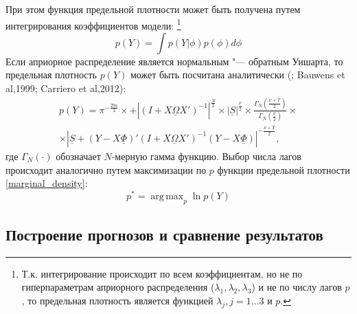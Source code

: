 \documentclass[11pt]{article} %
\DeclareMathOperator*{\argmax}{arg\,max}
\newcommand{\prior}{\underline}
\begin{document}
При этом функция предельной плотности может быть получена путем интегрирования коэффициентов модели: \footnote{Т.к. интегрирование происходит по  всем коэффициентам, но не по гиперпараметрам априорного распределения ($\lambda_1,\lambda_2,\lambda_3$)  и не по числу лагов $p$, то предельная плотность является функцией $\lambda_j,j=1\ldots 3$ и $p$.}
\begin{equation}
p(Y)=\int p(Y|\phi)p(\phi) d \phi
\end{equation}
Если априорное распределение является нормальным "--- обратным Уишарта, то предельная плотность $p(Y)$ может быть посчитана аналитически (\cite{zellner_1996}; Bauwens et al,1999; Carriero et al,2012):
\begin{multline}
p(Y)=\pi^{-\frac{Tm}{2}}\times +\left |(I+X\prior{\Omega} X')^{-1}\right|^{\frac{N}{2}}\times |\prior{S}|^{\frac{\prior{\nu}}{2}}\times \frac{\Gamma_N(\frac{\prior{\nu}+T}{2})}{\Gamma_N(\frac{\prior{\nu}}{2})}\times \\ \times
\left|\prior{S}+(Y-X\prior{\Phi})'(I+X\prior{\Omega} X')^{-1}(Y-X\prior{\Phi})\right|^{-\frac{\prior{\nu}+T}{2}},\label{marginal_density}
\end{multline}
где $\Gamma_N(\cdot)$ обозначает $N$-мерную гамма функцию.
Выбор числа лагов происходит аналогично путем максимизации по $p$ функции предельной плотности \eqref{marginal_density}: 
\begin{equation}
p^*=\argmax_{p} \ln p(Y)
\end{equation} 


\subsection{Построение прогнозов и сравнение результатов}
\end{document}
